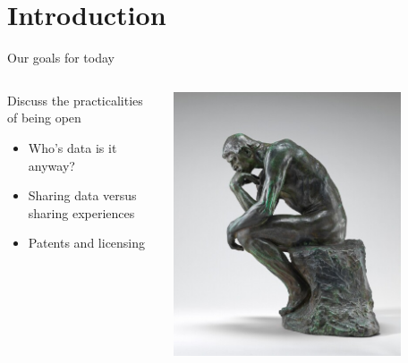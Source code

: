 \section{Introduction}
\label{sec:introduction}

\begin{frame}{Our goals for today}
    
    \begin{columns}[c]
        \begin{column}{.45\textwidth}
        
        Discuss the practicalities of being open
        
            \begin{itemize}
                \item Who's data is it anyway?
                \item Sharing data versus sharing experiences
                \item Patents and licensing
            \end{itemize}
        \end{column}
        
        \begin{column}{.45\textwidth}
            \includegraphics[width=0.8\textwidth]{images/the_thinker_NPA_1942_5_12.jpg}
            
        \end{column}
    \end{columns}
    
\end{frame}

